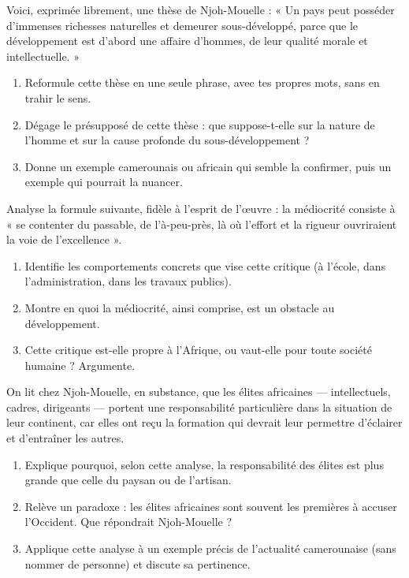 \documentclass[11pt]{article}
\newcounter{popsec}
\newcounter{popsub}
\newcommand{\courssub}[1]{%
  \stepcounter{popsub}%
  \par\vspace{9pt}\noindent{\popxbold\fontsize{11.5}{13}\selectfont\color{popink}{\color{poporange}\thepopsec.\thepopsub}\hspace{6pt}#1}\par\nopagebreak\vspace{4pt}
}
\begin{document}
\courssub{Je m'entraîne}

\begin{exercice}
Voici, exprimée librement, une thèse de Njoh-Mouelle : « Un pays peut posséder d'immenses richesses naturelles et demeurer sous-développé, parce que le développement est d'abord une affaire d'hommes, de leur qualité morale et intellectuelle. »

\begin{enumerate}
\item Reformule cette thèse en une seule phrase, avec tes propres mots, sans en trahir le sens.
\item Dégage le présupposé de cette thèse : que suppose-t-elle sur la nature de l'homme et sur la cause profonde du sous-développement ?
\item Donne un exemple camerounais ou africain qui semble la confirmer, puis un exemple qui pourrait la nuancer.
\end{enumerate}
\end{exercice}

\begin{exercice}
Analyse la formule suivante, fidèle à l'esprit de l'œuvre : la médiocrité consiste à « se contenter du passable, de l'à-peu-près, là où l'effort et la rigueur ouvriraient la voie de l'excellence ».

\begin{enumerate}
\item Identifie les comportements concrets que vise cette critique (à l'école, dans l'administration, dans les travaux publics).
\item Montre en quoi la médiocrité, ainsi comprise, est un obstacle au développement.
\item Cette critique est-elle propre à l'Afrique, ou vaut-elle pour toute société humaine ? Argumente.
\end{enumerate}
\end{exercice}

\begin{exercice}
On lit chez Njoh-Mouelle, en substance, que les élites africaines — intellectuels, cadres, dirigeants — portent une responsabilité particulière dans la situation de leur continent, car elles ont reçu la formation qui devrait leur permettre d'éclairer et d'entraîner les autres.

\begin{enumerate}
\item Explique pourquoi, selon cette analyse, la responsabilité des élites est plus grande que celle du paysan ou de l'artisan.
\item Relève un paradoxe : les élites africaines sont souvent les premières à accuser l'Occident. Que répondrait Njoh-Mouelle ?
\item Applique cette analyse à un exemple précis de l'actualité camerounaise (sans nommer de personne) et discute sa pertinence.
\end{enumerate}
\end{exercice}
\end{document}
